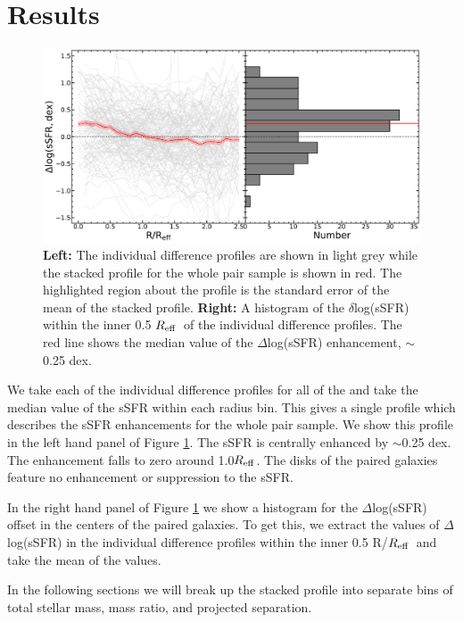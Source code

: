 \documentclass[iop,revtex4,twocolumn,apj,numberedappendix,appendixfloats]{emulateapj}
\newcommand{\reff}{$R_{\rm eff}$}
\begin{document}
\section{Results}\label{sec:results}
\begin{figure}
\centering
\includegraphics[width=\linewidth]{fig/ssfr_unsplit.pdf}
\caption[]{\textbf{Left:} The individual difference profiles are shown in light grey while the stacked profile for the whole pair sample is shown in red. The highlighted region about the profile is the standard error of the mean of the stacked profile. \textbf{Right:} A histogram of the $\delta$log(sSFR) within the inner 0.5 \reff\ of the individual difference profiles. The red line shows the median value of the $\Delta$log(sSFR) enhancement, $\sim$0.25 dex.}
\label{fig:ssfr_all}
\end{figure}

We take each of the individual difference profiles for all of the and take the median value of the sSFR within each radius bin. This gives a single profile which describes the sSFR enhancements for the whole pair sample. We show this profile in the left hand panel of Figure \ref{fig:ssfr_all}. The sSFR is centrally enhanced by $\sim$0.25 dex. The enhancement falls to zero around 1.0\reff. The disks of the paired galaxies feature no enhancement or suppression to the sSFR. 

In the right hand panel of Figure \ref{fig:ssfr_all} we show a histogram for the $\Delta$log(sSFR) offset in the centers of the paired galaxies. To get this, we extract the values of $\Delta$log(sSFR) in the individual difference profiles within the inner 0.5 R/\reff\ and take the mean of the values. 

In the following sections we will break up the stacked profile into separate bins of total stellar mass, mass ratio, and projected separation. 
\end{document}
